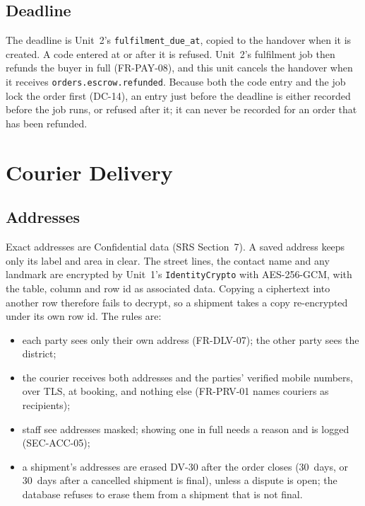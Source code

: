 \documentclass[11pt,a4paper]{article}
\begin{document}
\subsection{Deadline}
The deadline is Unit~2's \texttt{fulfilment\_due\_at}, copied to the handover when it is created. A code entered at or after it is refused. Unit~2's fulfilment job then refunds the buyer in full (FR-PAY-08), and this unit cancels the handover when it receives \texttt{orders.escrow.refunded}. Because both the code entry and the job lock the order first (DC-14), an entry just before the deadline is either recorded before the job runs, or refused after it; it can never be recorded for an order that has been refunded.

\section{Courier Delivery}
\label{sec:courier}

\subsection{Addresses}
\label{sec:addresses}
Exact addresses are Confidential data (SRS Section~7). A saved address keeps only its label and area in clear. The street lines, the contact name and any landmark are encrypted by Unit~1's \texttt{IdentityCrypto} with AES-256-GCM, with the table, column and row id as associated data. Copying a ciphertext into another row therefore fails to decrypt, so a shipment takes a copy re-encrypted under its own row id. The rules are:
\begin{itemize}[nosep]
  \item each party sees only their own address (FR-DLV-07); the other party sees the district;
  \item the courier receives both addresses and the parties' verified mobile numbers, over TLS, at booking, and nothing else (FR-PRV-01 names couriers as recipients);
  \item staff see addresses masked; showing one in full needs a reason and is logged (SEC-ACC-05);
  \item a shipment's addresses are erased DV-30 after the order closes (30~days, or 30~days after a cancelled shipment is final), unless a dispute is open; the database refuses to erase them from a shipment that is not final.
\end{itemize}
\end{document}

